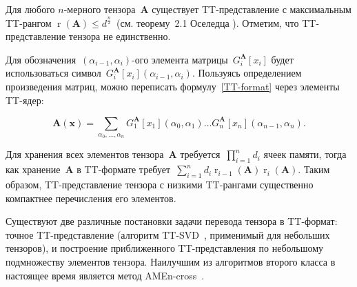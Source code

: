\documentclass{article} %
\DeclareMathOperator{\rank}{r}
\renewcommand{\vec}[1]{\boldsymbol{#1}}
\begin{document}
Для любого $n$-мерного тензора~$\mathbf{A}$ существует TT\hyp{}представление с максимальным TT\hyp{}рангом $\rank(\mathbf{A}) \leq d^{\frac{n}{2}}$~(см. теорему~2.1 Оселедца \cite{oseledets2011ttMain}). Отметим, что TT\hyp{}представление тензора не единственно.


Для обозначения~$(\alpha_{i-1}, \alpha_{i})$-ого элемента матрицы~$G_i^{\mathbf{A}}[x_i]$ будет использоваться символ~$G_i^{\mathbf{A}}[x_i](\alpha_{i-1}, \alpha_{i})$.
Пользуясь определением произведения матриц, можно переписать формулу~\eqref{TT-format} через элементы TT\hyp{}ядер:

\begin{equation}
	\label{TT-format-sum}
	\mathbf{A}(\vec{x}) =
	\sum_{\alpha_0, \ldots, \alpha_n} G^{\mathbf{A}}_1[x_1](\alpha_0, \alpha_1) \ldots G^{\mathbf{A}}_n[x_n](\alpha_{n-1}, \alpha_n).
\end{equation}

Для хранения всех элементов тензора~$\mathbf{A}$ требуется~$\prod_{i=1}^n d_i$ ячеек памяти, тогда как хранение~$\mathbf{A}$ в TT\hyp{}формате требует~$\sum_{i=1}^n d_i \rank_{i-1}(\mathbf{A}) \rank_{i}(\mathbf{A})$. Таким образом, TT\hyp{}представление тензора с низкими TT\hyp{}рангами существенно компактнее перечисления его элементов.

Существуют две различные постановки задачи перевода тензора в TT\hyp{}формат: точное TT\hyp{}представление (алгоритм TT-SVD~\cite{oseledets2011ttMain}, применимый для небольших тензоров), и построение приближенного TT\hyp{}представления по небольшому подмножеству элементов тензора. Наилучшим из алгоритмов второго класса в настоящее время является метод AMEn-cross~\cite{dolgov2013amenCross}.
\end{document}
